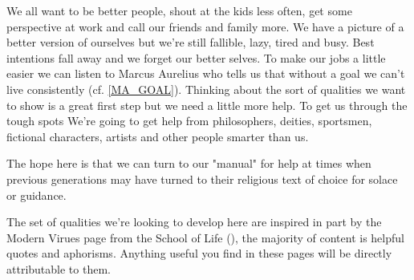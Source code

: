 
\cleardoublepage

We all want to be better people, shout at the kids less often, get some perspective at work and call our friends and family more. We have a picture of a better version of ourselves but we're still fallible, lazy, tired and busy. Best intentions fall away and we forget our better selves. 
To make our jobs a little easier we can listen to Marcus Aurelius who tells us that without a goal we can't live consistently (cf. \ref{MA_GOAL}). Thinking about the sort of qualities we want to show is a great first step but we need a little more help. 
To get us through the tough spots We're going to get help from philosophers, deities, sportsmen, fictional characters, artists and other people smarter than us. 

The hope here is that we can turn to our "manual" for help at times when previous generations may have turned to their religious text of choice for solace or guidance. 

The set of qualities we're looking to develop here are inspired in part by the Modern Virues page from the School of Life (), the majority of content is helpful quotes and aphorisms. Anything useful you find in these pages will be directly attributable to them. 
